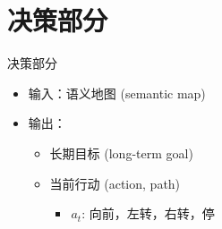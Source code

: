 \section{决策部分}
\label{sec:policy}
\begin{frame}{决策部分}
    \begin{itemize}
        \item 输入：语义地图 (semantic map)
        \item 输出：
            \begin{itemize}
                \item 长期目标 (long-term goal)
                \item 当前行动 (action, path)
                \begin{itemize}
                    \item $a_t$: 向前，左转，右转，停
                \end{itemize}
            \end{itemize}
    \end{itemize}
\end{frame}


